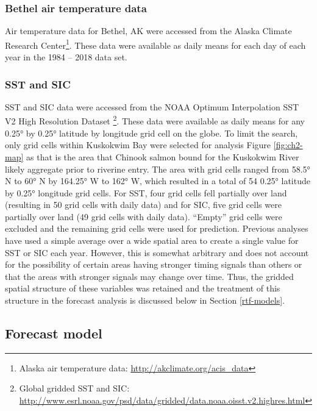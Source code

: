 \documentclass[12pt,]{book}
\let\rmarkdownfootnote\footnote%
\def\footnote{\protect\rmarkdownfootnote}
\theoremstyle{definition}
\theoremstyle{definition}
\theoremstyle{definition}
\theoremstyle{remark}
\begin{document}
\subsubsection{Bethel air temperature
data}\label{bethel-air-temperature-data}

\noindent
Air temperature data for Bethel, AK were accessed from the Alaska
Climate Research Center\footnote{Alaska air temperature data:
  \url{http://akclimate.org/acis_data}}. These data were available as
daily means for each day of each year in the 1984 -- 2018 data set.

\subsubsection{SST and SIC}\label{sst-and-sic}

\noindent
SST and SIC data were accessed from the NOAA Optimum Interpolation SST
V2 High Resolution Dataset \citep{reynolds-etal-2007}\footnote{Global
  gridded SST and SIC:
  \url{http://www.esrl.noaa.gov/psd/data/gridded/data.noaa.oisst.v2.highres.html}}.
These data were available as daily means for any 0.25° by 0.25° latitude
by longitude grid cell on the globe. To limit the search, only grid
cells within Kuskokwim Bay were selected for analysis Figure
\ref{fig:ch2-map} as that is the area that Chinook salmon bound for the
Kuskokwim River likely aggregate prior to riverine entry. The area with
grid cells ranged from 58.5° N to 60° N by 164.25° W to 162° W, which
resulted in a total of 54 0.25° latitude by 0.25° longitude grid cells.
For SST, four grid cells fell partially over land (resulting in 50 grid
cells with daily data) and for SIC, five grid cells were partially over
land (49 grid cells with daily data). ``Empty'' grid cells were excluded
and the remaining grid cells were used for prediction. Previous analyses
have used a simple average over a wide spatial area
\citep[e.g.,][]{mundy-evenson-2011} to create a single value for SST or
SIC each year. However, this is somewhat arbitrary and does not account
for the possibility of certain areas having stronger timing signals than
others or that the areas with stronger signals may change over time.
Thus, the gridded spatial structure of these variables was retained and
the treatment of this structure in the forecast analysis is discussed
below in Section \ref{rtf-models}.

\subsection{Forecast model}\label{reg-models}
\end{document}
